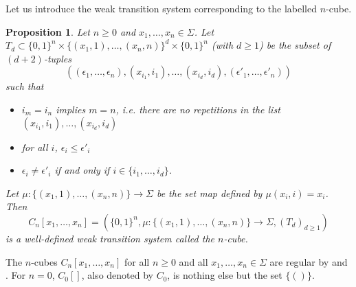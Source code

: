 \documentclass[a4paper,12pt]{amsart}
\newtheorem{prop}[thm]{Proposition}
\begin{document}
Let us introduce the weak transition system corresponding to the
labelled $n$-cube.

\begin{prop} \label{cas_cube} \cite[Proposition~5.2]{hdts} Let $n{\geqslant} 0$ and
$x_1,\dots,x_n\in \Sigma$. Let $T_d\subset \{0,1\}^n \times
\{(x_1,1),\dots,(x_n,n)\}^d \times \{0,1\}^n$ (with $d{\geqslant} 1$) be the
subset of $(d+2)$-tuples
\[((\epsilon_1,\dots,\epsilon_n), (x_{i_1},i_1),\dots,(x_{i_d},i_d),
(\epsilon'_1,\dots,\epsilon'_n))\] such that
\begin{itemize}
\item $i_m = i_n$ implies $m = n$, i.e. there are no repetitions in the
  list $(x_{i_1},i_1),\dots,(x_{i_d},i_d)$
\item for all $i$, $\epsilon_i{\leqslant} \epsilon'_i$
\item $\epsilon_i\neq \epsilon'_i$ if and only if
  $i\in\{i_1,\dots,i_d\}$. 
\end{itemize}
Let $\mu : \{(x_1,1),\dots,(x_n,n)\} \rightarrow \Sigma$ be the set
map defined by $\mu(x_i,i) = x_i$. Then \[C_n[x_1,\dots,x_n] =
(\{0,1\}^n,\mu : \{(x_1,1),\dots,(x_n,n)\}\rightarrow
\Sigma,(T_d)_{d{\geqslant} 1})\] is a well-defined weak transition system
called the {\rm $n$-cube}. \end{prop}

The $n$-cubes $C_n[x_1,\dots,x_n]$ for all $n{\geqslant} 0$ and all
$x_1,\dots,x_n\in \Sigma$ are regular by \cite[Proposition~4.6]{hdts}
and \cite[Proposition~5.2]{hdts}.  For $n = 0$, $C_0[]$, also denoted
by $C_0$, is nothing else but the set $\{()\}$.  
\end{document}
